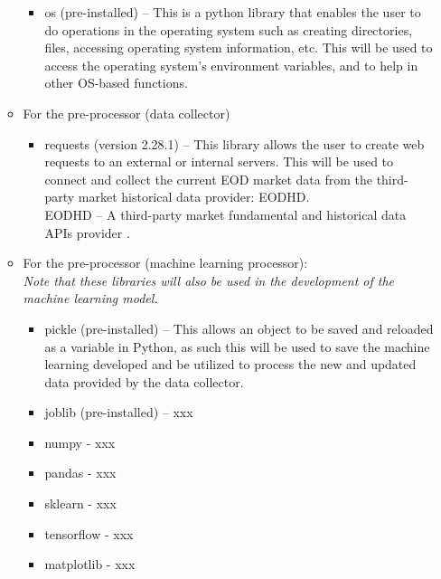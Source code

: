 \begin{itemize}
\begin{itemize}
\begin{itemize}
                    \item[\ding{109}] os (pre-installed) – This is a python library that enables 
                    the user to do operations in the operating system such as creating directories, 
                    files, accessing operating system information, etc. This will be used to access 
                    the operating system’s environment variables, and to help in other OS-based functions.
                \end{itemize}
            \item[\ding{108}] For the pre-processor (data collector)
                \begin{itemize}
                    \item[\ding{109}] requests (version 2.28.1) – This library allows the user to create web 
                    requests to an external or internal servers. This will be used to connect and collect 
                    the current EOD market data from the third-party market historical data provider: EODHD.
                    \\ EODHD – A third-party market fundamental and historical data APIs provider
                    \cite{EODHD}.
                \end{itemize}
            \item[\ding{108}] For the pre-processor (machine learning processor):
            \\ \textit{Note that these libraries will also be used in the development of the machine learning model.}
                \begin{itemize}
                    \item[\ding{109}] pickle (pre-installed) – This allows an object to be 
                    saved and reloaded as a variable in Python, as such this will be used to 
                    save the machine learning developed and be utilized to process the new and 
                    updated data provided by the data collector.
                    \item[\ding{109}] joblib (pre-installed) – xxx
                    \item[\ding{109}] numpy - xxx
                    \item[\ding{109}] pandas - xxx
                    \item[\ding{109}] sklearn - xxx
                    \item[\ding{109}] tensorflow - xxx
                    \item[\ding{109}] matplotlib - xxx

\end{itemize}
\end{itemize}
\end{itemize}
